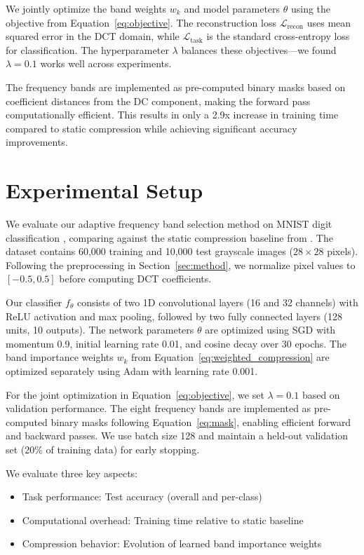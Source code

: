 \documentclass{article} %
\begin{document}
We jointly optimize the band weights $w_k$ and model parameters $\theta$ using the objective from Equation~\ref{eq:objective}. The reconstruction loss $\mathcal{L}_{\text{recon}}$ uses mean squared error in the DCT domain, while $\mathcal{L}_{\text{task}}$ is the standard cross-entropy loss for classification. The hyperparameter $\lambda$ balances these objectives---we found $\lambda=0.1$ works well across experiments.

The frequency bands are implemented as pre-computed binary masks based on coefficient distances from the DC component, making the forward pass computationally efficient. This results in only a 2.9x increase in training time compared to static compression while achieving significant accuracy improvements.

\section{Experimental Setup}
\label{sec:experimental}

We evaluate our adaptive frequency band selection method on MNIST digit classification \citep{Deng2012TheMD}, comparing against the static compression baseline from \citet{wang2022learning}. The dataset contains 60,000 training and 10,000 test grayscale images ($28 \times 28$ pixels). Following the preprocessing in Section~\ref{sec:method}, we normalize pixel values to $[-0.5, 0.5]$ before computing DCT coefficients.

Our classifier $f_\theta$ consists of two 1D convolutional layers (16 and 32 channels) with ReLU activation and max pooling, followed by two fully connected layers (128 units, 10 outputs). The network parameters $\theta$ are optimized using SGD with momentum 0.9, initial learning rate 0.01, and cosine decay over 30 epochs. The band importance weights $w_k$ from Equation~\ref{eq:weighted_compression} are optimized separately using Adam with learning rate 0.001.

For the joint optimization in Equation~\ref{eq:objective}, we set $\lambda=0.1$ based on validation performance. The eight frequency bands are implemented as pre-computed binary masks following Equation~\ref{eq:mask}, enabling efficient forward and backward passes. We use batch size 128 and maintain a held-out validation set (20\% of training data) for early stopping.

We evaluate three key aspects:
\begin{itemize}
    \item Task performance: Test accuracy (overall and per-class)
    \item Computational overhead: Training time relative to static baseline
    \item Compression behavior: Evolution of learned band importance weights
\end{itemize}
\end{document}
